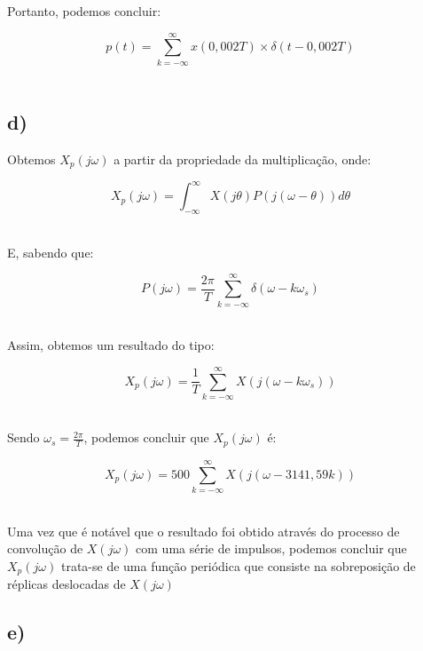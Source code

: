 \documentclass{article}[a4paper,12pt,twoside]
\begin{document}
Portanto, podemos concluir:
\begin{center}
    $$p(t) = \sum_{k=- \infty}^{\infty} x(0,002T) \times \delta(t - 0,002T)$$\\
\end{center}


\subsection{d)}
Obtemos $X_p(j\omega)$ a partir da propriedade da multiplicação, onde:
\begin{center}
    $$X_p(j\omega) = \int_{-\infty}^{\infty} X(j\theta)P(j(\omega - \theta)) d\theta$$\\
\end{center}
E, sabendo que:
\begin{center}
    \vspace{0.25cm}
    $$P(j\omega) = \frac{2\pi}{T} \sum_{k=- \infty}^{\infty} \delta(\omega - k\omega_s)$$\\
    \vspace{0.25cm}
\end{center}
Assim, obtemos um resultado do tipo:
\begin{center}
    \vspace{0.25cm}
    $$X_p(j\omega) = \frac{1}{T} \sum_{k=- \infty}^{\infty} X(j(\omega - k\omega_s))$$\\
    \vspace{0.25cm}  
\end{center}

Sendo $\omega_s = \frac{2\pi}{T}$, podemos concluir que $X_p(j\omega)$ é:

\begin{center}
    \vspace{0.25cm}
    $$X_p(j\omega) = 500 \sum_{k=- \infty}^{\infty} X(j(\omega - 3141,59k))$$\\
    \vspace{0.25cm} 
\end{center}

Uma vez que é notável que o resultado foi obtido através do processo de convolução de $X(j\omega)$ com uma série de impulsos, podemos concluir que $X_p(j\omega)$ trata-se de uma função periódica que consiste na sobreposição de réplicas deslocadas de $X(j\omega)$

\subsection{e)}
\end{document}
